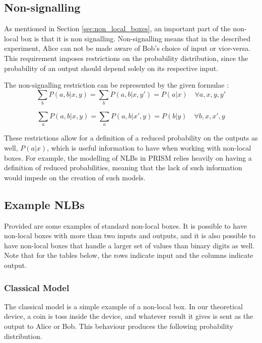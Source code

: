 \documentclass[report.tex]{subfiles}
\begin{document}
\subsection{Non-signalling} %
\label{sub:non_signalling}
As mentioned in Section \ref{sec:non_local_boxes}, an important part of the
non-local box is that it is non signalling. Non-signalling means that in the
described experiment, Alice can not be made aware of Bob's choice of input or
vice-versa. This requirement imposes restrictions on the probability
distribution, since the probability of an output should depend solely on its
respective input. 

The non-signalling restriction can be represented by the given formulae
\cite[Section~II.A]{PhysRevA.71.022101}:
\begin{equation} \label{eq:non-signal_1}
\sum_{b} P(a, b | x, y) = \sum_{b} P(a, b | x, y') = P(a | x) 
\quad \forall a, x, y, y'
\end{equation}

\begin{equation} \label{eq:non-signal_2}
\sum_{a} P(a, b | x, y) = \sum_{a} P(a, b | x', y) = P(b | y) 
\quad \forall b, x, x', y
\end{equation}

These restrictions allow for a definition of a reduced probability on the
outputs as well, \(P(a | x)\), which is useful information to have when
working with non-local boxes. For example, the modelling of NLBs in PRISM relies
heavily on having a definition of reduced probabilities, meaning that the lack
of such information would impede on the creation of such models.

\subsection{Example NLBs} %
\label{sub:example_nlbs}
Provided are some examples of standard non-local boxes. It is possible to have
non-local boxes with more than two inputs and outputs, and it is also possible
to have non-local boxes that handle a larger set of values than binary digits
as well. Note that for the tables below, the rows indicate input and the columns
indicate output.

\subsubsection{Classical Model} %
\label{ssub:classical_model}
The classical model is a simple example of a non-local box. In our theoretical
device, a coin is toss inside the device, and whatever result it gives is sent
as the output to Alice or Bob. This behaviour produces the following probability
distribution.
\end{document}

